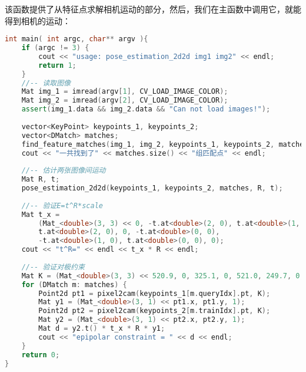 该函数提供了从特征点求解相机运动的部分，然后，我们在主函数中调用它，就能得到相机的运动：
\begin{lstlisting}[language=c++,caption=slambook2/ch7/pose_estimation_2d2d.cpp （片段）]
int main( int argc, char** argv ){
    if (argc != 3) {
        cout << "usage: pose_estimation_2d2d img1 img2" << endl;
        return 1;
    }
    //-- 读取图像
    Mat img_1 = imread(argv[1], CV_LOAD_IMAGE_COLOR);
    Mat img_2 = imread(argv[2], CV_LOAD_IMAGE_COLOR);
    assert(img_1.data && img_2.data && "Can not load images!");
    
    vector<KeyPoint> keypoints_1, keypoints_2;
    vector<DMatch> matches;
    find_feature_matches(img_1, img_2, keypoints_1, keypoints_2, matches);
    cout << "一共找到了" << matches.size() << "组匹配点" << endl;
    
    //-- 估计两张图像间运动
    Mat R, t;
    pose_estimation_2d2d(keypoints_1, keypoints_2, matches, R, t);
    
    //-- 验证E=t^R*scale
    Mat t_x =
        (Mat_<double>(3, 3) << 0, -t.at<double>(2, 0), t.at<double>(1, 0),
        t.at<double>(2, 0), 0, -t.at<double>(0, 0),
        -t.at<double>(1, 0), t.at<double>(0, 0), 0);
    cout << "t^R=" << endl << t_x * R << endl;
    
    //-- 验证对极约束
    Mat K = (Mat_<double>(3, 3) << 520.9, 0, 325.1, 0, 521.0, 249.7, 0, 0, 1);
    for (DMatch m: matches) {
        Point2d pt1 = pixel2cam(keypoints_1[m.queryIdx].pt, K);
        Mat y1 = (Mat_<double>(3, 1) << pt1.x, pt1.y, 1);
        Point2d pt2 = pixel2cam(keypoints_2[m.trainIdx].pt, K);
        Mat y2 = (Mat_<double>(3, 1) << pt2.x, pt2.y, 1);
        Mat d = y2.t() * t_x * R * y1;
        cout << "epipolar constraint = " << d << endl;
    }
    return 0;
}
\end{lstlisting}

